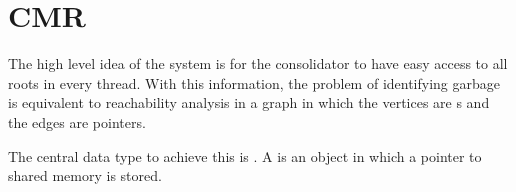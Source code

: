 \chapter{CMR}

The high level idea of the system is for the consolidator to have easy access to all roots in every
thread. With this information, the problem of identifying garbage is equivalent to reachability
analysis in a graph in which the vertices are s and the edges are pointers.

The central data type to achieve this is . A  is an object in which
a pointer to shared memory is stored.
